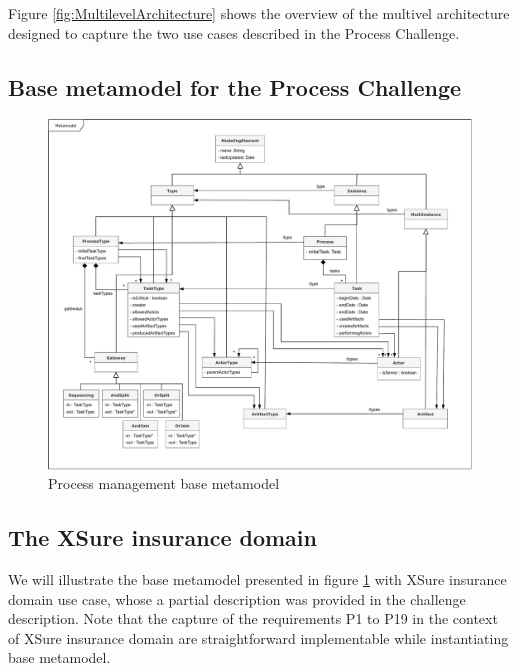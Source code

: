 
Figure \ref{fig:MultilevelArchitecture} shows the overview of the multivel architecture designed to capture the two use cases described in the Process Challenge.


\subsection{Base metamodel for the Process Challenge}

\begin{figure}
 \centering
    \includegraphics[width=1.0 \textwidth]{Figures/Metamodel.pdf}
    \caption{Process management base metamodel}
    \label{fig:BaseMetamodel}
\end{figure}

\subsection{The XSure insurance domain}

We will illustrate the base metamodel presented in figure \ref{fig:BaseMetamodel}  with XSure insurance domain use case, whose a partial description was provided in the challenge description. Note that the capture of the requirements P1 to P19 in the context of XSure insurance domain are straightforward implementable while instantiating base metamodel.

